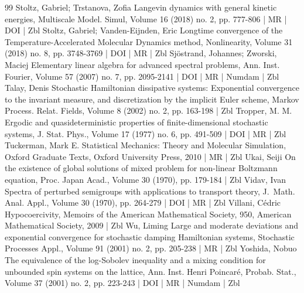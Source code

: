 \begin{thebibliography}{99}
Stoltz, Gabriel; Trstanova, Zofia Langevin dynamics with general kinetic energies, Multiscale Model. Simul, Volume 16 (2018) no. 2, pp. 777-806 | MR | DOI | Zbl
Stoltz, Gabriel; Vanden-Eijnden, Eric Longtime convergence of the Temperature-Accelerated Molecular Dynamics method, Nonlinearity, Volume 31 (2018) no. 8, pp. 3748-3769 | DOI | MR | Zbl
Sjöstrand, Johannes; Zworski, Maciej Elementary linear algebra for advanced spectral problems, Ann. Inst. Fourier, Volume 57 (2007) no. 7, pp. 2095-2141 | DOI | MR | Numdam | Zbl
Talay, Denis Stochastic Hamiltonian dissipative systems: Exponential convergence to the invariant measure, and discretization by the implicit Euler scheme, Markov Process. Relat. Fields, Volume 8 (2002) no. 2, pp. 163-198 | Zbl
Tropper, M. M. Ergodic and quasideterministic properties of finite-dimensional stochastic systems, J. Stat. Phys., Volume 17 (1977) no. 6, pp. 491-509 | DOI | MR | Zbl
Tuckerman, Mark E. Statistical Mechanics: Theory and Molecular Simulation, Oxford Graduate Texts, Oxford University Press, 2010 | MR | Zbl
Ukai, Seiji On the existence of global solutions of mixed problem for non-linear Boltzmann equation, Proc. Japan Acad., Volume 30 (1970), pp. 179-184 | Zbl
Vidav, Ivan Spectra of perturbed semigroups with applications to transport theory, J. Math. Anal. Appl., Volume 30 (1970), pp. 264-279 | DOI | MR | Zbl
Villani, Cédric Hypocoercivity, Memoirs of the American Mathematical Society, 950, American Mathematical Society, 2009 | Zbl
Wu, Liming Large and moderate deviations and exponential convergence for stochastic damping Hamiltonian systems, Stochastic Processes Appl., Volume 91 (2001) no. 2, pp. 205-238 | MR | Zbl
Yoshida, Nobuo The equivalence of the log-Sobolev inequality and a mixing condition for unbounded spin systems on the lattice, Ann. Inst. Henri Poincaré, Probab. Stat., Volume 37 (2001) no. 2, pp. 223-243 | DOI | MR | Numdam | Zbl
\end{thebibliography}
